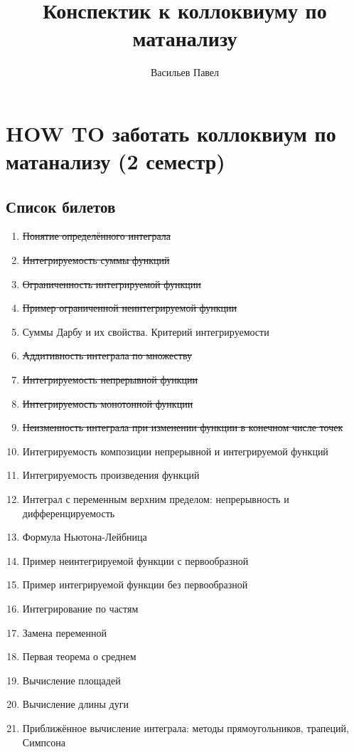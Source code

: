 \documentclass[a4paper]{article}
\title{Конспектик к коллоквиуму по матанализу}
\author{Васильев Павел}
\begin{document}
\section*{HOW TO заботать коллоквиум по матанализу (2 семестр)}


\subsection*{Список билетов}
\begin{enumerate}
\item \sout{Понятие определённого интеграла}
\item \sout{Интегрируемость суммы функций}
\item \sout{Ограниченность интегрируемой функции}
\item \sout{Пример ограниченной неинтегрируемой функции}
\item Суммы Дарбу и их свойства. Критерий интегрируемости
\item \sout{Аддитивность интеграла по множеству}
\item \sout{Интегрируемость непрерывной функции}
\item \sout{Интегрируемость монотонной функции}
\item \sout{Неизменность интеграла при изменении функции в конечном числе точек}
\item Интегрируемость композиции непрерывной и интегрируемой функций
\item Интегрируемость произведения функций
\item Интеграл с переменным верхним пределом: непрерывность и дифференцируемость
\item Формула Ньютона-Лейбница
\item Пример неинтегрируемой функции с первообразной
\item Пример интегрируемой функции без первообразной
\item Интегрирование по частям
\item Замена переменной
\item Первая теорема о среднем
\item Вычисление площадей
\item Вычисление длины дуги
\item Приближённое вычисление интеграла: методы прямоугольников, трапеций, Симпсона 
\end{enumerate}

\newpage
\end{document}
